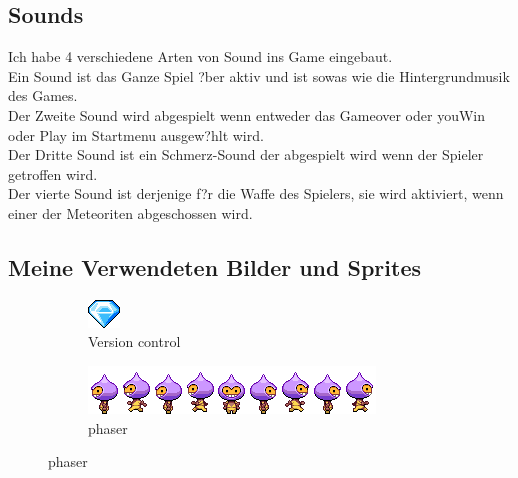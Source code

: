 \documentclass{article}
\begin{document}
    \subsection{Sounds}
    Ich habe 4 verschiedene Arten von Sound ins Game eingebaut.\\
    Ein Sound ist das Ganze Spiel ?ber aktiv und ist sowas wie die Hintergrundmusik des Games.\\
    Der Zweite Sound wird abgespielt wenn entweder das Gameover oder youWin oder Play im Startmenu ausgew?hlt wird.\\
    Der Dritte Sound ist ein Schmerz-Sound der abgespielt wird wenn der Spieler getroffen wird.\\
    Der vierte Sound ist derjenige f?r die Waffe des Spielers, sie wird aktiviert, wenn einer der Meteoriten abgeschossen wird.\\



\subsection{Meine Verwendeten Bilder und Sprites}

\begin{figure}[ht]
\centering
\begin{subfigure}{.5\textwidth}
  \centering
  \includegraphics[width=.3\linewidth]{diamond}
  \caption{Version control}
  \label{fig:sub1}
\end{subfigure}%
\begin{subfigure}{.5\textwidth}
  \centering
  \includegraphics[width=.6\linewidth]{dude}
  \caption{phaser}
  \label{fig:sub2}
\end{subfigure}
\end{figure}
\end{document}
